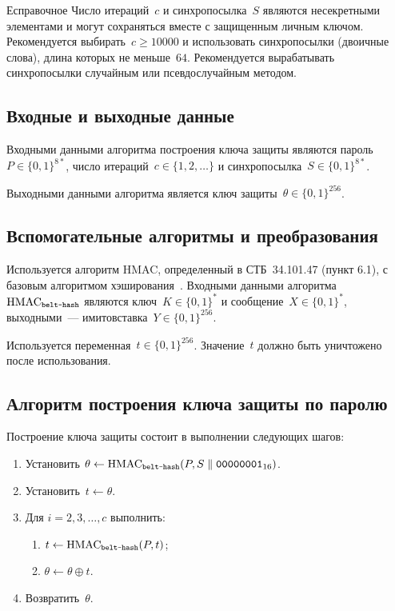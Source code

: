 \begin{appendix}{Е}{справочное}
Число итераций~$c$ и синхропосылка~$S$ являются несекретными элементами и могут
сохраняться вместе с защищенным личным ключом.
%
Рекомендуется выбирать~$c\geq 10000$ и использовать синхропосылки (двоичные
слова), длина которых не меньше~$64$.
%
Рекомендуется вырабатывать синхропосылки случайным или псевдослучайным методом.


\label{PASSWORD.PBKDF}

\subsection{Входные и выходные данные}\label{PASSWORD.PBKDF.IO}

Входными данными алгоритма построения ключа защиты являются
пароль~$P\in\{0,1\}^{8*}$, число итераций~$c\in\{1,2,\ldots\}$ и
синхропосылка~$S\in\{0,1\}^{8*}$.

Выходными данными алгоритма является ключ защиты~$\theta\in\{0,1\}^{256}$.
  
\subsection{Вспомогательные алгоритмы и 
преобразования}\label{PASSWORD.PBKDF.Aux}
 
Используется алгоритм HMAC, определенный в СТБ~34.101.47 (пункт 6.1), с базовым
алгоритмом хэширования~. Входными данными
алгоритма~$\text{\normalfont HMAC}_{\texttt{belt-hash}}$ являются ключ~$K\in\{0,1\}^*$ и
сообщение~$X\in\{0,1\}^*$, выходными~--- имитовставка~$Y\in\{0,1\}^{256}$.

Используется переменная~$t\in\{0,1\}^{256}$. Значение~$t$ должно быть уничтожено
после использования.

\subsection{Алгоритм построения ключа защиты по 
паролю}\label{PASSWORD.PBKDF.Alg}

Построение ключа защиты состоит в выполнении следующих шагов:
\begin{enumerate}
\item
Установить
$\theta\leftarrow\text{\normalfont HMAC}_{\texttt{belt-hash}}
(P,S\parallel \texttt{00000001}_{16})$.
\item
Установить~$t\leftarrow \theta$.
\item
Для $i=2,3,\ldots,c$ выполнить:
\begin{enumerate}
\item
$t\leftarrow\text{\normalfont HMAC}_{\texttt{belt-hash}}(P,t)$;
\item
$\theta\leftarrow\theta\oplus t$.
\end{enumerate}
\item
Возвратить~$\theta$.
\end{enumerate}


\end{appendix}
